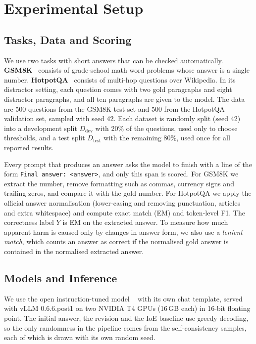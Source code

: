 \section{Experimental Setup}
\label{sec:methodology}

\subsection{Tasks, Data and Scoring}
We use two tasks with short answers that can be checked automatically. \textbf{GSM8K}~\cite{cobbe2021gsm8k} consists of grade-school math word problems whose answer is a single number. \textbf{HotpotQA}~\cite{yang2018hotpotqa} consists of multi-hop questions over Wikipedia. In its distractor setting, each question comes with two gold paragraphs and eight distractor paragraphs, and all ten paragraphs are given to the model. The data are 500 questions from the GSM8K test set and 500 from the HotpotQA validation set, sampled with seed 42. Each dataset is randomly split (seed 42) into a development split $D_{\text{dev}}$ with 20\% of the questions, used only to choose thresholds, and a test split $D_{\text{test}}$ with the remaining 80\%, used once for all reported results.

Every prompt that produces an answer asks the model to finish with a line of the form \texttt{Final answer: <answer>}, and only this span is scored. For GSM8K we extract the number, remove formatting such as commas, currency signs and trailing zeros, and compare it with the gold number. For HotpotQA we apply the official answer normalisation (lower-casing and removing punctuation, articles and extra whitespace) and compute exact match (EM) and token-level F1. The correctness label $Y$ is EM on the extracted answer. To measure how much apparent harm is caused only by changes in answer form, we also use a \emph{lenient match}, which counts an answer as correct if the normalised gold answer is contained in the normalised extracted answer.

\subsection{Models and Inference}
We use the open instruction-tuned model \modelA{}~\cite{qwen2025qwen25} with its own chat template, served with vLLM 0.6.6.post1 on two NVIDIA T4 GPUs (16\,GB each) in 16-bit floating point. The initial answer, the revision and the IoE baseline use greedy decoding, so the only randomness in the pipeline comes from the self-consistency samples, each of which is drawn with its own random seed.


